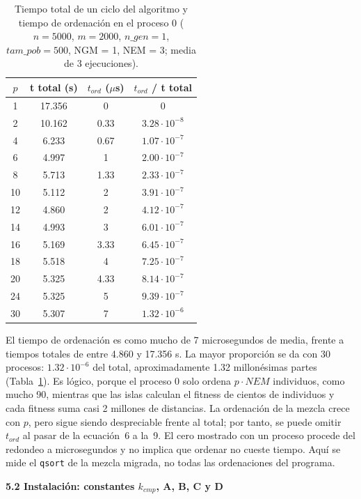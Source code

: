 \documentclass[12pt]{article}
\begin{document}
\begin{enumerate}
\begin{table}[htbp]
\centering
\begin{tabular}{c|ccc}
\toprule
\textbf{$p$} & \textbf{t total (s)} & \textbf{$t_{ord}$ ($\mu$s)} & \textbf{$t_{ord}$ / t total} \\
\midrule
1 & 17.356 & 0 & 0 \\
2 & 10.162 & 0.33 & $3.28 \cdot 10^{-8}$ \\
4 & 6.233 & 0.67 & $1.07 \cdot 10^{-7}$ \\
6 & 4.997 & 1 & $2.00 \cdot 10^{-7}$ \\
8 & 5.713 & 1.33 & $2.33 \cdot 10^{-7}$ \\
10 & 5.112 & 2 & $3.91 \cdot 10^{-7}$ \\
12 & 4.860 & 2 & $4.12 \cdot 10^{-7}$ \\
14 & 4.993 & 3 & $6.01 \cdot 10^{-7}$ \\
16 & 5.169 & 3.33 & $6.45 \cdot 10^{-7}$ \\
18 & 5.518 & 4 & $7.25 \cdot 10^{-7}$ \\
20 & 5.325 & 4.33 & $8.14 \cdot 10^{-7}$ \\
24 & 5.325 & 5 & $9.39 \cdot 10^{-7}$ \\
30 & 5.307 & 7 & $1.32 \cdot 10^{-6}$ \\
\bottomrule
\end{tabular}
\caption{Tiempo total de un ciclo del algoritmo y tiempo de ordenación en el proceso 0 ($n = 5000$, $m = 2000$, $n\_gen = 1$, $tam\_pob = 500$, NGM = 1, NEM = 3; media de 3 ejecuciones).}
\label{tab:c5_tord}
\end{table}

El tiempo de ordenación es como mucho de 7 microsegundos de media, frente a tiempos totales de entre 4.860 y 17.356 s. La mayor proporción se da con 30 procesos: $1.32 \cdot 10^{-6}$ del total, aproximadamente 1.32 millonésimas partes (Tabla~\ref{tab:c5_tord}). Es lógico, porque el proceso 0 solo ordena $p \cdot NEM$ individuos, como mucho 90, mientras que las islas calculan el fitness de cientos de individuos y cada fitness suma casi 2 millones de distancias. La ordenación de la mezcla crece con $p$, pero sigue siendo despreciable frente al total; por tanto, se puede omitir $t_{ord}$ al pasar de la ecuación~6 a la~9. El cero mostrado con un proceso procede del redondeo a microsegundos y no implica que ordenar no cueste tiempo. Aquí se mide el \texttt{qsort} de la mezcla migrada, no todas las ordenaciones del programa.

\medskip
\noindent\textbf{5.2 Instalación: constantes $k_{cmp}$, A, B, C y D}\par
\smallskip


\end{enumerate}
\end{document}
